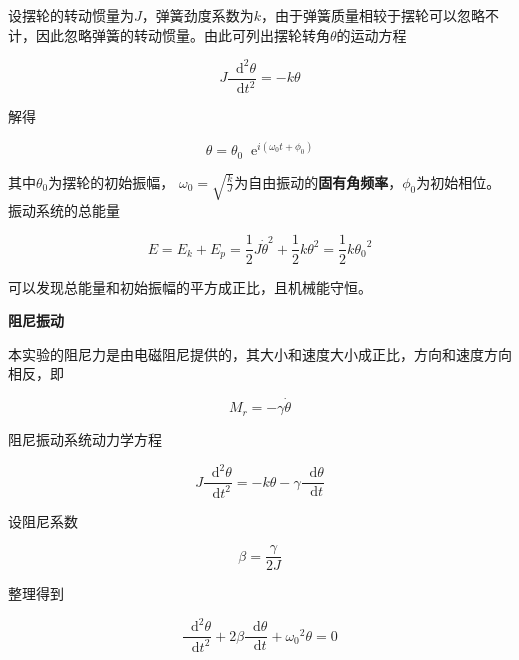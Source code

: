 \documentclass[a4paper,11pt]{article}
\newcommand*{\dif}{\mathop{}\!\mathrm{d}}
\newcommand*{\e}{\mathop{}\!\mathrm{e}}
\begin{document}
        设摆轮的转动惯量为$ J $，弹簧劲度系数为$ k $，由于弹簧质量相较于摆轮可以忽略不计，因此忽略弹簧的转动惯量。由此可列出摆轮转角$ \theta $的运动方程

        \begin{equation}
            J \frac{\dif^2 \theta}{\dif t^2} = -k \theta
        \end{equation}

        解得

        \begin{equation}
            \theta = \theta_0 \e^{i(\omega_0 t + \phi_0)}
        \end{equation}

        其中$ \theta_0 $为摆轮的初始振幅， $ \omega_0=\sqrt{\frac{k}{J}} $为自由振动的\textbf{固有角频率}，$ \phi_0 $为初始相位。振动系统的总能量

        \begin{equation}
            E = E_k + E_p = \frac{1}{2}J\dot{\theta}^2 + \frac{1}{2}k\theta^2 = \frac{1}{2}k{\theta_0} ^2
            \label{eq: energy wrt amplitude}
        \end{equation}

        可以发现总能量和初始振幅的平方成正比，且机械能守恒。

        \textbf{阻尼振动}

        本实验的阻尼力是由电磁阻尼提供的，其大小和速度大小成正比，方向和速度方向相反，即

        \begin{equation}
            M_r = -\gamma \dot{\theta}
        \end{equation}

        阻尼振动系统动力学方程

        \begin{equation}
            J\frac{\dif^2\theta}{\dif t ^2} = -k\theta - \gamma \frac{\dif \theta}{\dif t}
        \end{equation}

        设阻尼系数
        
        \begin{equation}
            \beta = \frac{\gamma}{2J}
            \label{eq: beta}
        \end{equation}

        整理得到

        \begin{equation}
            \frac{\dif^2\theta}{\dif t^2} + 2\beta\frac{\dif\theta}{\dif t} + {\omega_0}^2 \theta = 0
            \label{eq: damped}
        \end{equation}
\end{document}
